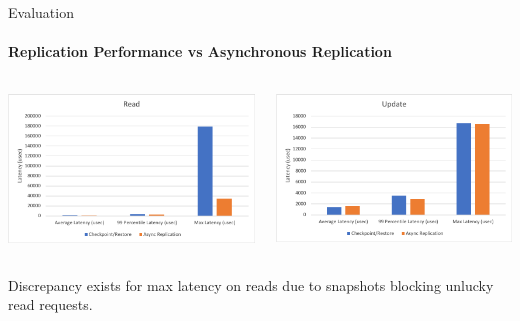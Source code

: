 \documentclass{beamer}
\begin{document}
\begin{frame}{Evaluation}
  \framesubtitle{Replication Performance vs Asynchronous Replication}

  \begin{columns}
    \includegraphics[scale=0.37]{../paper/async-replication-read}

    \includegraphics[scale=0.37]{../paper/async-replication-update}
  \end{columns}

  \hspace{1cm}

  \centering
  Discrepancy exists for max latency on reads due to snapshots blocking unlucky read requests.
\end{frame}
\end{document}
